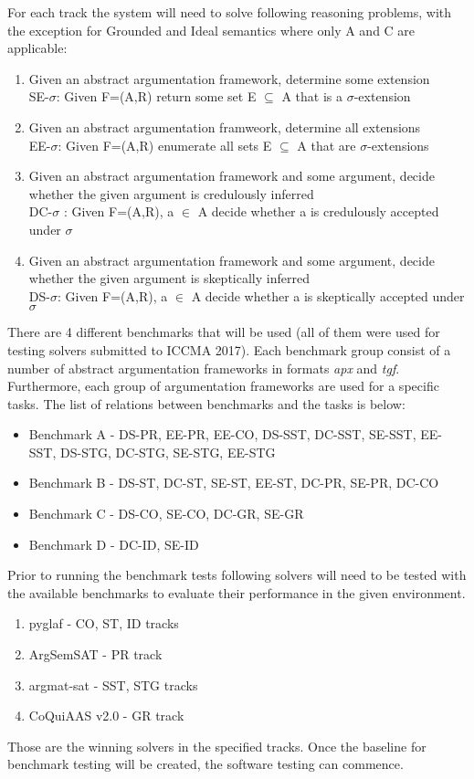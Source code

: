 For each track the system will need to solve following reasoning problems, with the exception for Grounded and Ideal semantics where only A and C are applicable:
\begin{enumerate}
	\item{Given an abstract argumentation framework, determine some extension\\SE-$\sigma$: Given F=(A,R) return some set E $\subseteq$ A that is a $\sigma$-extension}
	\item{Given an abstract argumentation framweork, determine all extensions\\EE-$\sigma$: Given F=(A,R) enumerate all sets E $\subseteq$ A that are $\sigma$-extensions}
	\item{Given an abstract argumentation framework and some argument, decide whether the given argument is credulously inferred\\DC-$\sigma$ : Given F=(A,R), a $\in$ A decide whether a is credulously accepted under $\sigma$}
	\item{Given an abstract argumentation framework and some argument, decide whether the given argument is skeptically inferred\\DS-$\sigma$: Given F=(A,R), a $\in$ A decide whether a is skeptically accepted under $\sigma$}
\end{enumerate}

There are 4 different benchmarks that will be used (all of them were used for testing solvers submitted to ICCMA 2017). Each benchmark group consist of a number of abstract argumentation frameworks in formats \textit{apx} and \textit{tgf}. Furthermore, each group of argumentation frameworks are used for a specific tasks. The list of relations between benchmarks and the tasks is below:
\begin{itemize}
	\item{Benchmark A - DS-PR, EE-PR, EE-CO, DS-SST, DC-SST, SE-SST, EE-SST, DS-STG, DC-STG, SE-STG, EE-STG}
	\item{Benchmark B - DS-ST, DC-ST, SE-ST, EE-ST, DC-PR, SE-PR, DC-CO}
	\item{Benchmark C - DS-CO, SE-CO, DC-GR, SE-GR}
	\item{Benchmark D - DC-ID, SE-ID}
\end{itemize}


Prior to running the benchmark tests following solvers will need to be tested with the available benchmarks to evaluate their performance in the given environment.
\begin{enumerate}
	\item{pyglaf - CO, ST, ID tracks}
	\item{ArgSemSAT - PR track}
	\item{argmat-sat - SST, STG tracks}
	\item{CoQuiAAS v2.0 - GR track}
\end{enumerate}
Those are the winning solvers in the specified tracks. Once the baseline for benchmark testing will be created, the software testing can commence.